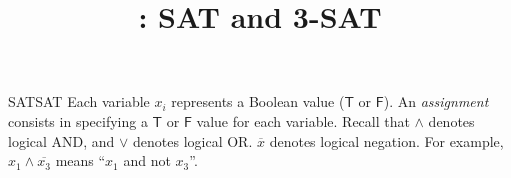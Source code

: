 \documentclass{tufte-handout}
\title{\thecourse: SAT and 3-SAT}
\date{}
\begin{document}
\maketitle


\newcommand{\True}{\ensuremath{\mathsf{T}}\xspace}
\newcommand{\False}{\ensuremath{\mathsf{F}}\xspace}

\begin{model*}{SAT}{SAT}
  Each variable $x_i$ represents a Boolean value (\True or \False).
  An \emph{assignment} consists in specifying a \True or \False value
  for each variable.  Recall that $\land$ denotes logical AND, and
  $\lor$ denotes logical OR. $\overline{x}$ denotes logical
  negation. For example, $x_1 \land \overline{x_3}$ means ``$x_1$ and
  not $x_3$''.\bigskip


\end{model*}
\end{document}
